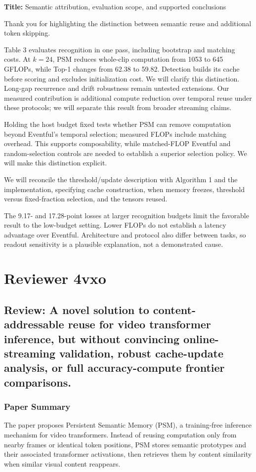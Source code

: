 \documentclass[11pt]{article}
\begin{document}
\textbf{Title:} Semantic attribution, evaluation scope, and supported conclusions

Thank you for highlighting the distinction between semantic reuse and additional token skipping.

Table 3 evaluates recognition in one pass, including bootstrap and matching costs. At $k=24$, PSM reduces whole-clip computation from 1053 to 645 GFLOPs, while Top-1 changes from 62.38 to 59.82. Detection builds its cache before scoring and excludes initialization cost. We will clarify this distinction. Long-gap recurrence and drift robustness remain untested extensions. Our measured contribution is additional compute reduction over temporal reuse under these protocols; we will separate this result from broader streaming claims.

Holding the host budget fixed tests whether PSM can remove computation beyond Eventful's temporal selection; measured FLOPs include matching overhead. This supports composability, while matched-FLOP Eventful and random-selection controls are needed to establish a superior selection policy. We will make this distinction explicit.

We will reconcile the threshold/update description with Algorithm 1 and the implementation, specifying cache construction, when memory freezes, threshold versus fixed-fraction selection, and the tensors reused.

The 9.17- and 17.28-point losses at larger recognition budgets limit the favorable result to the low-budget setting. Lower FLOPs do not establish a latency advantage over Eventful. Architecture and protocol also differ between tasks, so readout sensitivity is a plausible explanation, not a demonstrated cause.

\clearpage

\section{Reviewer 4vxo}

\subsection*{Review: A novel solution to content-addressable reuse for video transformer inference, but without convincing online-streaming validation, robust cache-update analysis, or full accuracy-compute frontier comparisons.}

\subsubsection*{Paper Summary}
The paper proposes Persistent Semantic Memory (PSM), a training-free inference mechanism for video transformers. Instead of reusing computation only from nearby frames or identical token positions, PSM stores semantic prototypes and their associated transformer activations, then retrieves them by content similarity when similar visual content reappears.
\end{document}
